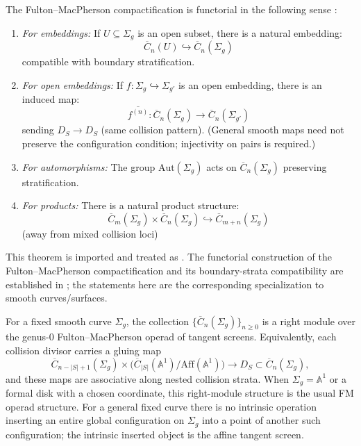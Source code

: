 \begin{theorem}\label{thm:FM-functorial}
The Fulton--MacPherson compactification is functorial in the following
sense \cite{FM94}:

\begin{enumerate}
\item \emph{For embeddings:} If $U \subseteq \Sigma_g$ is an open subset, there is a natural embedding:
\[\overline{C}_n(U) \hookrightarrow \overline{C}_n(\Sigma_g)\]
compatible with boundary stratification.

\item \emph{For open embeddings:} If $f: \Sigma_g \hookrightarrow \Sigma_{g'}$ is an open embedding, there is an induced map:
\[\overline{f^{(n)}}: \overline{C}_n(\Sigma_g) \to \overline{C}_n(\Sigma_{g'})\]
sending $D_S \to D_S$ (same collision pattern). (General smooth maps need not preserve the configuration condition; injectivity on pairs is required.)

\item \emph{For automorphisms:} The group $\text{Aut}(\Sigma_g)$ acts on $\overline{C}_n(\Sigma_g)$ preserving stratification.

\item \emph{For products:} There is a natural product structure:
\[\overline{C}_m(\Sigma_g) \times \overline{C}_n(\Sigma_g) \hookrightarrow \overline{C}_{m+n}(\Sigma_g)\]
(away from mixed collision loci)
\end{enumerate}
\end{theorem}

\begin{remark}
This theorem is imported and treated as \ClaimStatusProvedElsewhere. The
functorial construction of the Fulton--MacPherson compactification and its
boundary-strata compatibility are established in \cite{FM94}; the statements
here are the corresponding specialization to smooth curves/surfaces.
\end{remark}

\begin{theorem}\label{thm:FM-operad}
For a fixed smooth curve $\Sigma_g$, the collection
$\{\overline{C}_n(\Sigma_g)\}_{n\geq 0}$ is a right module over the
genus-$0$ Fulton--MacPherson operad of tangent screens. Equivalently,
each collision divisor carries a gluing map
\[
\overline{C}_{n-|S|+1}(\Sigma_g)
\times
\bigl(\overline{C}_{|S|}(\mathbb{A}^1)/
\mathrm{Aff}(\mathbb{A}^1)\bigr)
\longrightarrow
D_S\subset \overline{C}_n(\Sigma_g),
\]
and these maps are associative along nested collision strata. When
$\Sigma_g=\mathbb{A}^1$ or a formal disk with a chosen coordinate, this
right-module structure is the usual FM operad structure. For a general
fixed curve there is no intrinsic operation inserting an entire global
configuration on $\Sigma_g$ into a point of another such configuration;
the intrinsic inserted object is the affine tangent screen.
\end{theorem}

